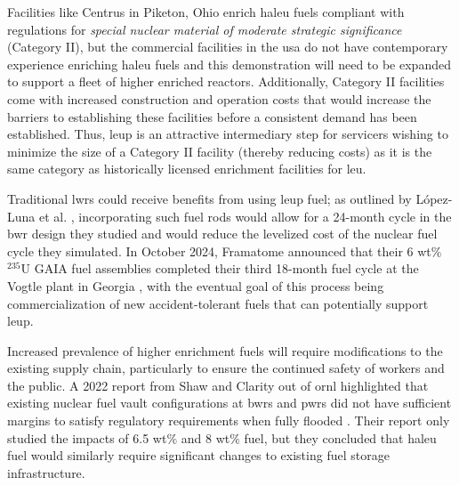 Facilities like Centrus in Piketon, Ohio enrich \gls{haleu} fuels compliant with regulations for \textit{special nuclear material of moderate strategic significance} (Category II), but the commercial facilities in the \gls{usa} do not have contemporary experience enriching \gls{haleu} fuels and this demonstration will need to be expanded to support a fleet of higher enriched reactors. Additionally, Category II facilities come with increased construction and operation costs that would increase the barriers to establishing these facilities before a consistent demand has been established. Thus, \gls{leup} is an attractive intermediary step for servicers wishing to minimize the size of a Category II facility (thereby reducing costs) as it is the same category as historically licensed enrichment facilities for \gls{leu}.

Traditional \glspl{lwr} could receive benefits from using \gls{leup} fuel; as outlined by L\'{o}pez-Luna et al. \cite{24_month_cycle_bwr}, incorporating such fuel rods would allow for a 24-month cycle in the \gls{bwr} design they studied and would reduce the levelized cost of the nuclear fuel cycle they simulated. In October 2024, Framatome announced that their 6 wt$\%$ $^{235}$U GAIA fuel assemblies completed their third 18-month fuel cycle at the Vogtle plant in Georgia \cite{framatome_press_2024}, with the eventual goal of this process being commercialization of new accident-tolerant fuels that can potentially support \gls{leup}.

Increased prevalence of higher enrichment fuels will require modifications to the existing supply chain, particularly to ensure the continued safety of workers and the public. A 2022 report from Shaw and Clarity out of \gls{ornl} highlighted that existing nuclear fuel vault configurations at \glspl{bwr} and \glspl{pwr} did not have sufficient margins to satisfy regulatory requirements when fully flooded \cite{leup_atf_storage_impacts}. Their report only studied the impacts of 6.5 wt$\%$ and 8 wt$\%$ fuel, but they concluded that \gls{haleu} fuel would similarly require significant changes to existing fuel storage infrastructure.